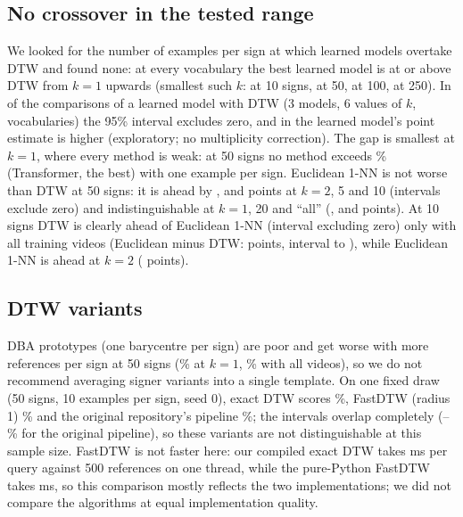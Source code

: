 \subsection{No crossover in the tested range}
We looked for the number of examples per sign at which learned models overtake DTW and found none: at every vocabulary the best
learned model is at or above DTW from $k=1$ upwards (smallest such $k$: \crossoverTen{} at 10 signs, \crossoverFifty{} at 50, \crossoverHundred{} at 100, \crossoverTwoFifty{} at 250).
In \nPairedLearnedExcl{} of the \nPairedLearned{} comparisons of a learned model with DTW (3 models, 6 values of $k$, \nVocabCount{} vocabularies) the 95\% interval excludes
zero, and in \nPairedLearnedAhead{} the learned model's point estimate is higher (exploratory; no multiplicity correction). The gap is smallest at $k=1$, where every method is weak: at 50 signs no method
exceeds \accTransVFiftyKOne\% (Transformer, the best) with one example per sign. Euclidean 1-NN is not worse than DTW at 50 signs:
it is ahead by \difEuclidVFiftyKTwo, \difEuclidVFiftyKFive{} and \difEuclidVFiftyKTen{} points at $k=2$, 5 and 10 (intervals exclude zero) and indistinguishable at $k=1$, 20 and ``all'' (\difEuclidVFiftyKOne, \difEuclidVFiftyKTwenty{} and \difEuclidVFiftyKAll{} points). At 10 signs DTW is clearly ahead
of Euclidean 1-NN (interval excluding zero) only with all training videos (Euclidean minus DTW: \difEuclidVTenKAll{} points, interval
\difLoEuclidVTenKAll{} to \difHiEuclidVTenKAll{}), while Euclidean 1-NN is ahead at $k=2$ (\difEuclidVTenKTwo{} points).

\subsection{DTW variants}
DBA prototypes (one barycentre per sign) are poor and get worse with more references per sign at 50 signs
(\accDbaVFiftyKOne\% at $k=1$, \accDbaVFiftyKAll\% with all videos), so we do not recommend averaging signer variants into a single
template. On one fixed draw (50 signs, 10 examples per sign, seed 0), exact DTW scores \accDtwSeedZeroVFiftyKTen\%, FastDTW
(radius 1) \accFastDtwVFiftyKTen\% and the original repository's pipeline \accLegacyVFiftyKTen\%; the intervals overlap
completely (\accLoLegacyVFiftyKTen--\accHiLegacyVFiftyKTen\% for the original pipeline), so these variants are not
distinguishable at this sample size. FastDTW is not faster here: our compiled exact DTW takes \latDtwKTen{} ms per query against 500 references on one thread, while the pure-Python FastDTW takes \latFastDtwKTen{} ms, so this comparison mostly reflects the two implementations; we did not compare the algorithms at equal implementation quality.

